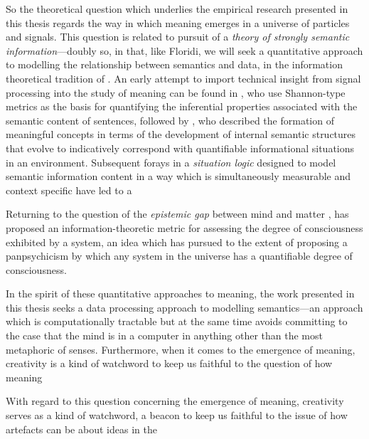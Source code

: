 

So the theoretical question which underlies the empirical research presented in this thesis regards the way in which meaning emerges in a universe of particles and signals.  This question is related to  pursuit of a \emph{theory of strongly semantic information}---doubly so, in that, like Floridi, we will seek a quantitative approach to modelling the relationship between semantics and data, in the information theoretical tradition of \cite{Shannon}.  An early attempt to import technical insight from signal processing into the study of meaning can be found in , who use Shannon-type metrics as the basis for quantifying the inferential properties associated with the semantic content of sentences, followed by \cite{Dretske}, who described the formation of meaningful concepts in terms of the development of internal semantic structures that evolve to indicatively correspond with quantifiable informational situations in an environment.  Subsequent forays in a \emph{situation logic} designed to model semantic information content in a way which is simultaneously measurable and context specific \citep{BarwiseEA} have led to a 

Returning to the question of the \emph{epistemic gap} between mind and matter \citep{Levine,Pattee}, \cite{Tonnoni} has proposed an information-theoretic metric for assessing the degree of consciousness exhibited by a system, an idea which \cite{Koch} has pursued to the extent of proposing a panpsychicism by which any system in the universe has a quantifiable degree of consciousness.

In the spirit of these quantitative approaches to meaning, the work presented in this thesis seeks a data processing approach to modelling semantics---an approach which is computationally tractable but at the same time avoids committing to the case that the mind is in a computer in anything other than the most metaphoric of senses.  Furthermore,  when it comes to the emergence of meaning, creativity is a kind of watchword to keep us faithful to the question of how meaning 

With regard to this question concerning the emergence of meaning, creativity serves as a kind of watchword, a beacon to keep us faithful to the issue of how artefacts can be about ideas in the 

